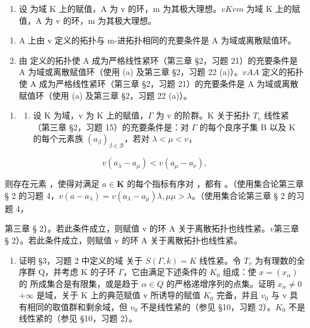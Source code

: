 \begin{enumerate}
\def\labelenumi{\arabic{enumi}.}
\setcounter{enumi}{3}
\tightlist
\item
  设  为域 K 上的赋值，A 为 v 的环，m 为其极大理想。\(v\)\(K\)\(v\)\(m\) 为域 K 上的赋值，A 为 v 的环，m 为其极大理想。
\end{enumerate}

\begin{enumerate}
\def\labelenumi{(\alph{enumi})}
\item
  A 上由 v 定义的拓扑与 m-进拓扑相同的充要条件是 A 为域或离散赋值环。
\item
  由  定义的拓扑使 A 成为严格线性紧环（第三章 §2，习题 21）的充要条件是 A 为域或离散赋值环（使用 (a) 及第三章 §2，习题 22 (a)）。\(v\)\(A\)\(A\) 定义的拓扑使 A 成为严格线性紧环（第三章 §2，习题 21）的充要条件是 A 为域或离散赋值环（使用 (a) 及第三章 §2，习题 22 (a)）。
\end{enumerate}

\begin{enumerate}
\def\labelenumi{\arabic{enumi}.}
\setcounter{enumi}{4}
\tightlist
\item
  \begin{enumerate}
  \def\labelenumii{(\alph{enumii})}
  \tightlist
  \item
    设 K 为域，v 为 K 上的赋值，\(\Gamma\) 为 v 的阶群。K 关于拓扑 \(T_{v}\) 线性紧（第三章 §2，习题 15）的充要条件是：对 \(\Gamma\) 的每个良序子集 B 以及 K 的每个元素族 \((a_{\beta})_{\beta\in\mathcal{B}}\)，若对 \(\lambda<\mu<v\)，
  \end{enumerate}
\end{enumerate}

\[
v (a _ {\lambda} - a _ {\mu}) <   v (a _ {\mu} - a _ {\nu}),
\]

则存在元素 ，使得对满足 \(a \in \mathbf{K}\) 的每个指标有序对 ，都有 。（使用集合论第三章 § 2 的习题 4，\(v(a - a_{\lambda}) = v(a_{\lambda} - a_{\mu})\)\(\lambda, \mu\)\(\mu > \lambda\)。（使用集合论第三章 § 2 的习题 4，

第三章 § 2）。若此条件成立，则赋值 v 的环 A 关于离散拓扑也线性紧。\(v\)第三章 § 2）。若此条件成立，则赋值 v 的环 A 关于离散拓扑也线性紧。

\begin{enumerate}
\def\labelenumi{(\alph{enumi})}
\setcounter{enumi}{1}
\tightlist
\item
  证明 §3，习题 2 中定义的域  关于 \(S(\Gamma, k) = K\) 线性紧。令 \(T_{v}\) 为有理数的全序群 Q，并考虑 K 的子环 \(\Gamma\)，它由满足下述条件的 \(K_{0}\) 组成：使 \(x = (x_{\alpha})\) 的  所成集合是有限集，或是趋于 \(\alpha \in Q\) 的严格递增序列的点集。证明 \(x_{\alpha} \neq 0\)\(+\infty\) 是域，关于 K 上的典范赋值 v 所诱导的赋值 \(K_{0}\) 完备，并且 \(v_{0}\) 与 v 具有相同的取值群和剩余域，但 \(v_{0}\) 不是线性紧的（参见 §10，习题 2）。\(K_{0}\) 不是线性紧的（参见 §10，习题 2）。
\end{enumerate}

